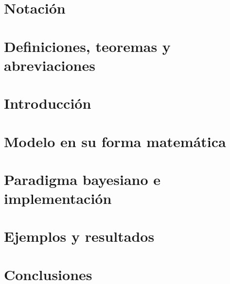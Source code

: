 \documentclass[pdftex,11pt, oneside]{book}
\begin{document}

%

\frontmatter
\tableofcontents
\listoffigures
\listoftables

\chapter{Notación} \label{ap:Notacion}


\chapter{Definiciones, teoremas y abreviaciones} \label{ap:Definiciones}



\mainmatter
\chapter{Introducción} \label{cap:Intro}


\chapter{Modelo en su forma matemática} \label{cap:Modelo}


\chapter{Paradigma bayesiano e implementación} \label{cap:BayesAlgoritmo}


\chapter{Ejemplos y resultados} \label{cap:EjYRes}


\chapter{Conclusiones} \label{cap:Conclusiones}

\end{document}
